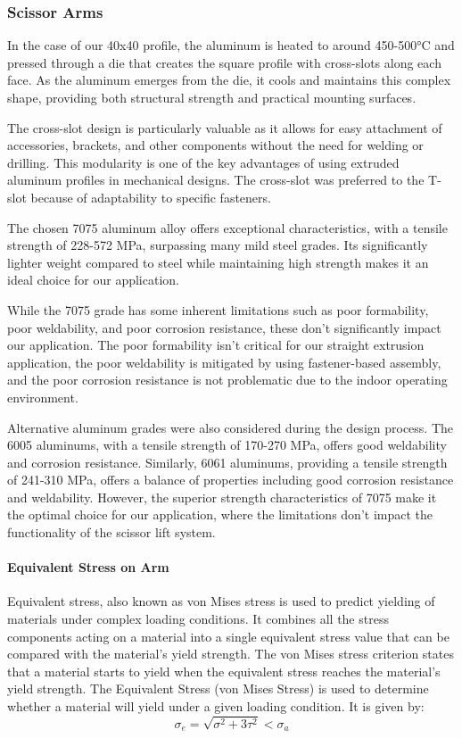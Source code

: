 \documentclass[../../main]{subfiles}
\begin{document}
\subsubsection{Scissor Arms}

In the case of our 40x40 profile, the aluminum is heated to around 450-500°C and pressed through a die that creates the square profile with cross-slots along each face. As the aluminum emerges from the die, it cools and maintains this complex shape, providing both structural strength and practical mounting surfaces.

The cross-slot design is particularly valuable as it allows for easy attachment of accessories, brackets, and other components without the need for welding or drilling. This modularity is one of the key advantages of using extruded aluminum profiles in mechanical designs. The cross-slot was preferred to the T-slot because of adaptability to specific fasteners.

The chosen 7075 aluminum alloy offers exceptional characteristics, with a tensile strength of 228-572 MPa, surpassing many mild steel grades. Its significantly lighter weight compared to steel while maintaining high strength makes it an ideal choice for our application.

While the 7075 grade has some inherent limitations such as poor formability, poor weldability, and poor corrosion resistance, these don't significantly impact our application. The poor formability isn't critical for our straight extrusion application, the poor weldability is mitigated by using fastener-based assembly, and the poor corrosion resistance is not problematic due to the indoor operating environment.

Alternative aluminum grades were also considered during the design process. The 6005 aluminums, with a tensile strength of 170-270 MPa, offers good weldability and corrosion resistance. Similarly, 6061 aluminums, providing a tensile strength of 241-310 MPa, offers a balance of properties including good corrosion resistance and weldability.
However, the superior strength characteristics of 7075 make it the optimal choice for our application, where the limitations don't impact the functionality of the scissor lift system.

\paragraph{Equivalent Stress on Arm}

Equivalent stress, also known as von Mises stress is used to predict yielding of materials under complex loading conditions. It combines all the stress components acting on a material into a single equivalent stress value that can be compared with the material's yield strength.
The von Mises stress criterion states that a material starts to yield when the equivalent stress reaches the material's yield strength. 
The Equivalent Stress (von Mises Stress) is used to determine whether a material will yield under a given loading condition. It is given by:
\begin{equation}
  \sigma_e = \sqrt{\sigma^2 + 3\tau^2} < \sigma_a
\end{equation}
\end{document}
